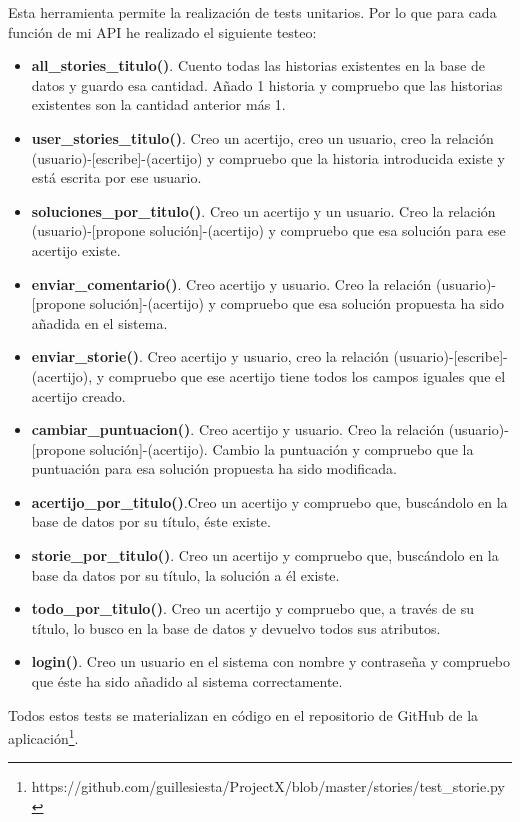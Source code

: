 Esta herramienta permite la realización de tests unitarios. Por lo que para cada función de mi API he realizado el siguiente testeo:

\begin{itemize}
    \item \textbf{all\_stories\_titulo()}. Cuento todas las historias existentes en la base de datos y guardo esa cantidad. Añado 1 historia y compruebo que las historias existentes son la cantidad anterior más 1.
     \item \textbf{user\_stories\_titulo()}. Creo un acertijo, creo un usuario, creo la relación (usuario)-[escribe]-(acertijo) y compruebo que la historia introducida existe y está escrita por ese usuario.
     \item \textbf{soluciones\_por\_titulo()}. Creo un acertijo y un usuario. Creo la relación (usuario)-[propone solución]-(acertijo) y compruebo que esa solución para ese acertijo existe.
     \item \textbf{enviar\_comentario()}. Creo acertijo y usuario. Creo la relación (usuario)-[propone solución]-(acertijo) y compruebo que esa solución propuesta ha sido añadida en el sistema.
     \item \textbf{enviar\_storie()}. Creo acertijo y usuario, creo la relación (usuario)-[escribe]-(acertijo), y compruebo que ese acertijo tiene todos los campos iguales que el acertijo creado.
     \item \textbf{cambiar\_puntuacion()}. Creo acertijo y usuario. Creo la relación (usuario)-[propone solución]-(acertijo). Cambio la puntuación y compruebo que la puntuación para esa solución propuesta ha sido modificada.
     \item \textbf{acertijo\_por\_titulo()}.Creo un acertijo y compruebo que, buscándolo en la base de datos por su título, éste existe.
     \item \textbf{storie\_por\_titulo()}. Creo un acertijo y compruebo que, buscándolo en la base da datos por su título, la solución a él existe.
     \item \textbf{todo\_por\_titulo()}. Creo un acertijo y compruebo que, a través de su título, lo busco en la base de datos y devuelvo todos sus atributos.
     \item \textbf{login()}. Creo un usuario en el sistema con nombre y contraseña y compruebo que éste ha sido añadido al sistema correctamente.
\end{itemize}

Todos estos tests se materializan en código en el repositorio de GitHub de la aplicación\footnote{https://github.com/guillesiesta/ProjectX/blob/master/stories/test\_storie.py}. 


